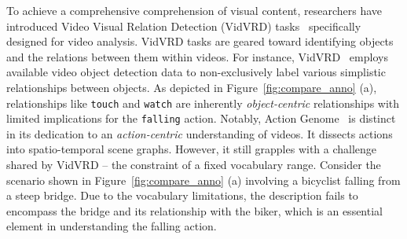 \documentclass[letterpaper]{article}
\begin{document}
To achieve a comprehensive comprehension of visual content, researchers have introduced Video Visual Relation Detection (VidVRD) tasks~\cite{Shang2017VideoVR,shang2019annotating} specifically designed for video analysis. VidVRD tasks are geared toward identifying objects and the relations between them within videos.
For instance, VidVRD~\cite{Shang2017VideoVR} employs available video object detection data to non-exclusively label various simplistic relationships between objects. As depicted in Figure~\ref{fig:compare_anno} (a), relationships like \texttt{touch} and \texttt{watch} are inherently \emph{object-centric} relationships with limited implications for the \texttt{falling} action.
Notably, Action Genome~\cite{genome} is distinct in its dedication to an \emph{action-centric} understanding of videos. It dissects actions into spatio-temporal scene graphs. However, it still grapples with a challenge shared by VidVRD – the constraint of a fixed vocabulary range. Consider the scenario shown in Figure~\ref{fig:compare_anno} (a) involving a bicyclist falling from a steep bridge. Due to the vocabulary limitations, the description fails to encompass the bridge and its relationship with the biker, which is an essential element in understanding the falling action.
\end{document}
